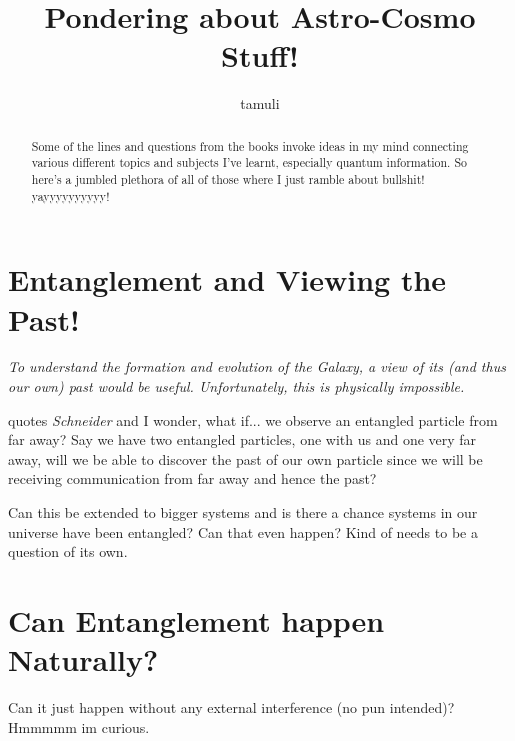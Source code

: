 \documentclass[a4paper,12pt]{article}
\title{Pondering about Astro-Cosmo Stuff!}
\author{tamuli}
\date{}
\newcommand{\ti}[1]{\textit{#1}}
\begin{document}
\maketitle

\begin{abstract}
  Some of the lines and questions from the books invoke ideas in my mind connecting various different topics and subjects I've learnt, especially quantum information. So here's a jumbled plethora of all of those where I just ramble about bullshit! yayyyyyyyyyy!
\end{abstract}

\tableofcontents

\newpage

\section{Entanglement and Viewing the Past!}
\ti{To understand the
formation and evolution of the Galaxy, a view of its (and
thus our own) past would be useful. Unfortunately, this is
physically impossible.}

\vspace{1em}

quotes \ti{Schneider}\cite{ref:Schneider-astro} and I wonder, what if... we observe an entangled particle from far away? Say we have two entangled particles, one with us and one very far away, will we be able to discover the past of our own particle since we will be receiving communication from far away and hence the past?

\vspace{1em}

Can this be extended to bigger systems and is there a chance systems in our universe have been entangled? Can that even happen? Kind of needs to be a question of its own.

\section{Can Entanglement happen Naturally?}

Can it just happen without any external interference (no pun intended)? Hmmmmm im curious.
\end{document}
